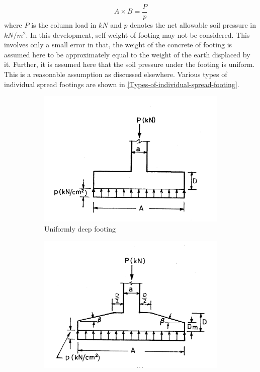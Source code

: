 \begin{equation}
\label{eq:footingArea}
A \times B = \frac{P}{p}
\end{equation}
where $P$ is the column load in $kN$ and $p$ denotes the net allowable
soil pressure in $kN/m^2$. In this development, self-weight of footing
may not be considered. This involves only a small error in that, the
weight of the concrete of footing is assumed here to be approximately
equal to the weight of the earth displaced by it. Further, it is assumed
here that the soil pressure under the footing is uniform. This is a 
reasonable assumption as discussed elsewhere. Various types of 
individual spread footings are shown in
\figmacro \ref{Types-of-individual-spread-footing}.
\begin{figure}
\begin{subfigure}[b]{0.5\textwidth}
  \includegraphics[width=\textwidth]{images/fig2291.png}
    \caption{Uniformly deep footing}
    \label{uniformdeepfooting}
  \end{subfigure}
  \begin{subfigure}[b]{0.5\textwidth}
    \includegraphics[width=\textwidth]{images/fig2292.png}

\end{subfigure}
\end{figure}
